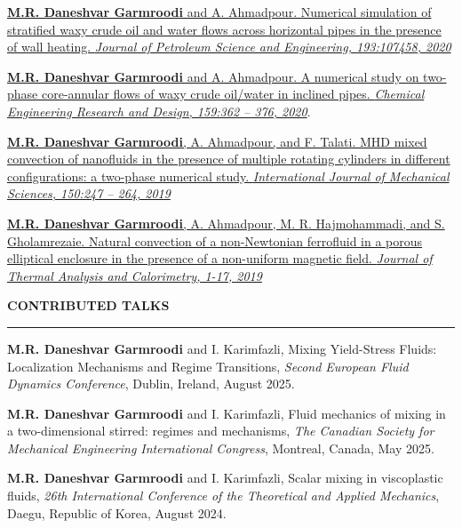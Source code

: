 \documentclass[10pt]{article}
\begin{document}
		\noindent \href{https://doi.org/10.1016/j.petrol.2020.107458}{\textbf{M.R. Daneshvar Garmroodi} and A. Ahmadpour. Numerical simulation of stratified waxy crude oil and water flows across horizontal pipes in the presence of wall heating.\textit{ Journal of Petroleum Science and Engineering, 193:107458, 2020}}
		
		\noindent  \href{https://doi.org/10.1016/j.cherd.2020.04.017}{\textbf{M.R. Daneshvar Garmroodi} and A. Ahmadpour. A numerical study on two-phase core-annular flows of waxy crude oil/water in inclined pipes.\textit{ Chemical Engineering Research and Design, 159:362
				– 376, 2020}}.
		
		\noindent \href{https://doi.org/10.1016/j.ijmecsci.2018.10.037}{\textbf{M.R. Daneshvar Garmroodi}, A. Ahmadpour, and F. Talati. MHD mixed convection
			of nanofluids in the presence of multiple rotating cylinders in different configurations:
			a two-phase numerical study.\textit{ International Journal of Mechanical Sciences, 150:247
				– 264, 2019}}
		
		\noindent  \href{https://link.springer.com/article/10.1007/s10973-019-09045-3}{\textbf{M.R. Daneshvar Garmroodi}, A. Ahmadpour, M. R. Hajmohammadi, and S. Gholamrezaie. Natural convection of a non-Newtonian ferrofluid in a porous elliptical enclosure in the presence of a non-uniform magnetic field.\textit{ Journal of Thermal Analysis and Calorimetry, 1-17, 2019}}
		
		\vspace{3mm}
		
		\noindent \textbf{\color{violet}CONTRIBUTED TALKS}
		
		\vspace{-2mm}
		
		\noindent\rule[0.5ex]{\linewidth}{1pt}
		
		
		\noindent \textbf{M.R. Daneshvar Garmroodi} and I. Karimfazli, Mixing Yield-Stress Fluids: Localization Mechanisms and Regime Transitions, \textit{Second European Fluid Dynamics Conference}, Dublin, Ireland, August 2025.
		
		\noindent \textbf{M.R. Daneshvar Garmroodi} and I. Karimfazli, Fluid mechanics of mixing in a two-dimensional stirred: regimes and mechanisms, \textit{The Canadian Society for Mechanical Engineering International Congress}, Montreal, Canada, May 2025.
		
		\noindent \textbf{M.R. Daneshvar Garmroodi} and I. Karimfazli, Scalar mixing in viscoplastic fluids, \textit{26th International Conference of the Theoretical and Applied Mechanics}, Daegu, Republic of Korea, August 2024.
		
\end{document}
